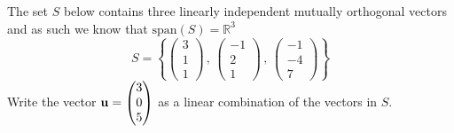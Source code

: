 \begin{problem}
        The set $S$ below contains three linearly independent mutually orthogonal vectors
        and as such we know that $\text{span}(S) = \mathbb{R}^3$
        \[ S = \left\{ \begin{pmatrix} 3 \\ 1 \\ 1 \end{pmatrix} \, , \, \begin{pmatrix}
                -1 \\ 2 \\ 1 \end{pmatrix} \, , \, \begin{pmatrix} -1 \\ -4 \\ 7
        \end{pmatrix} \right\} \]
        Write the vector ${\bf u} = \begin{pmatrix} 3 \\ 0 \\ 5 \end{pmatrix}$ as a linear
        combination of the vectors in $S$.
\end{problem}

